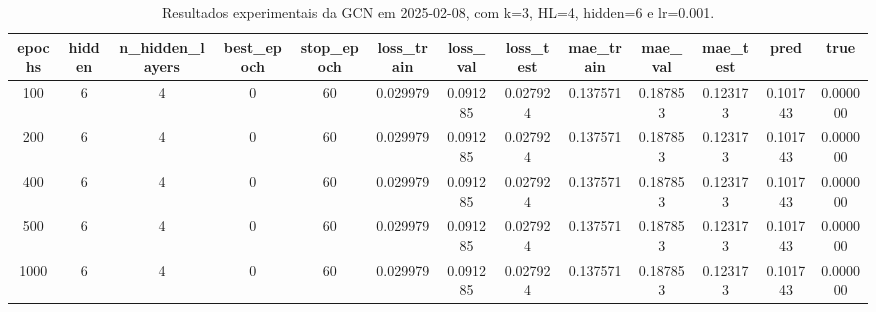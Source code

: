 \begin{table}[h]
\centering
\caption{Resultados experimentais da GCN em 2025-02-08, com k=3, HL=4, hidden=6 e lr=0.001.}
\label{tab:gcn_results_k3_hl4_h6_d20250208}
\begin{tabular}{ccccccccccccc}
\toprule
epochs & hidden & n\_hidden\_layers & best\_epoch & stop\_epoch & loss\_train & loss\_val & loss\_test & mae\_train & mae\_val & mae\_test & pred & true \\
\midrule
100 & 6 & 4 & 0 & 60 & 0.029979 & 0.091285 & 0.027924 & 0.137571 & 0.187853 & 0.123173 & 0.101743 & 0.000000 \\
200 & 6 & 4 & 0 & 60 & 0.029979 & 0.091285 & 0.027924 & 0.137571 & 0.187853 & 0.123173 & 0.101743 & 0.000000 \\
400 & 6 & 4 & 0 & 60 & 0.029979 & 0.091285 & 0.027924 & 0.137571 & 0.187853 & 0.123173 & 0.101743 & 0.000000 \\
500 & 6 & 4 & 0 & 60 & 0.029979 & 0.091285 & 0.027924 & 0.137571 & 0.187853 & 0.123173 & 0.101743 & 0.000000 \\
1000 & 6 & 4 & 0 & 60 & 0.029979 & 0.091285 & 0.027924 & 0.137571 & 0.187853 & 0.123173 & 0.101743 & 0.000000 \\
\bottomrule
\end{tabular}
\end{table}
